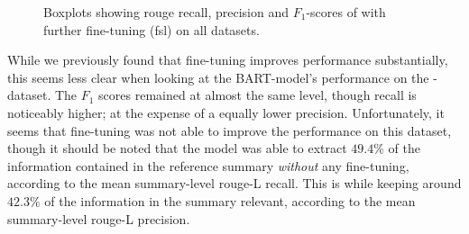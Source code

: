 \begin{figure}[htbp]
\centering
{}%
\hfill{}%
%
\hfill{}%
\caption{Boxplots showing \acs*{rouge} recall, precision and \(F_1\)-scores
of  with further fine-tuning (\acs*{fsl}) on all datasets.}
\label{fig:bart_cnn_fsl_all_datasets}
\end{figure}

While we previously found that fine-tuning improves performance substantially,
this seems less clear when looking at the BART-model's performance on the \telco{}-dataset.
The \(F_1\) scores remained at almost the same level, though recall is noticeably higher;
at the expense of a equally lower precision.
Unfortunately, it seems that fine-tuning was not able to improve the performance on this dataset,
though it should be noted that the model was able to extract \(49.4\%\)
of the information contained in the reference summary \emph{without} any fine-tuning,
according to the mean summary-level \acs*{rouge}-L recall.
This is while keeping around \(42.3\%\) of the information in the summary relevant,
according to the mean summary-level \acs*{rouge}-L precision.

